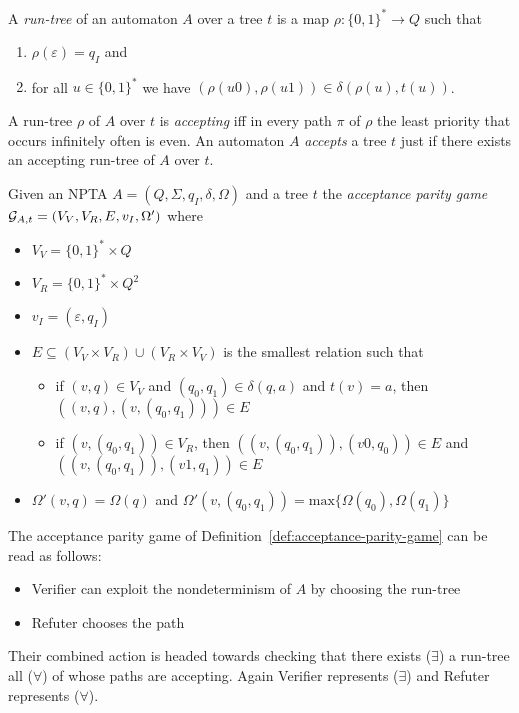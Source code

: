 \documentclass[runningheads,a4paper]{llncs}
\begin{document}
A \emph{run-tree} of an automaton $A$ over a tree $t$ is a map $\rho: \{0,1\}^* \to Q$ such that 
\begin{enumerate}
\item $\rho(\varepsilon) = q_I$ and
\item for all $u \in \{0,1\}^*$ we have $(\rho(u0), \rho(u1)) \in \delta(\rho(u), t(u))$.
\end{enumerate}

A run-tree $\rho$ of $A$ over $t$ is \emph{accepting} iff in every path $\pi$ of $\rho$ the least priority that occurs infinitely often is even. An automaton $A$ \emph{accepts} a tree $t$ just if there exists an accepting run-tree of $A$ over $t$.

\begin{definition}\label{def:acceptance-parity-game}
Given an NPTA $A = (Q, \Sigma, q_I, \delta, \Omega)$ and a tree $t$ the \emph{acceptance parity game} 
 $\mathcal{G}_{A,t} = (V_V, V_R, E, v_I, \Omega')$ where 
\begin{itemize}
\item $V_V = \{0,1\}^* \times Q$
\item $V_R = \{0,1\}^* \times Q^2$
\item $v_I = (\varepsilon, q_I)$
\item $E \subseteq (V_V \times V_R) \cup (V_R \times V_V)$ is the smallest relation such that
\begin{itemize}
\item if $(v,q) \in V_V$ and $(q_0, q_1) \in \delta(q, a)$ and $t(v) = a$, then \mbox{$((v,q), (v,(q_0,q_1))) \in E$}
\item if $(v,(q_0,q_1)) \in V_R$, then $((v,(q_0,q_1)), (v0, q_0) ) \in E$ and \mbox{$((v,(q_0,q_1)), (v1, q_1) ) \in E$}
\end{itemize}
\item $\Omega'(v,q) = \Omega(q)$ and $\Omega'(v,(q_0,q_1)) = \mathrm{max}\{\Omega(q_0),\Omega(q_1)\}$
\end{itemize}
\end{definition}

The acceptance parity game of Definition~\ref{def:acceptance-parity-game} can be read as follows:
\begin{itemize}
\item Verifier can exploit the nondeterminism of $A$ by choosing the run-tree
\item Refuter chooses the path
\end{itemize}
Their combined action is headed towards checking that there exists ($\exists$) a run-tree all ($\forall$) of whose paths are accepting. Again Verifier represents ($\exists$) and Refuter represents ($\forall$).
\end{document}
